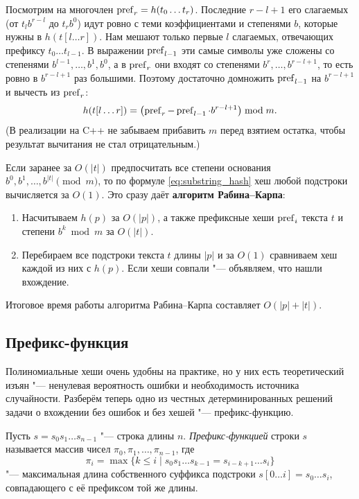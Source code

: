 Посмотрим на многочлен $\operatorname{pref}_r = h(t_0 \dots t_r)$. Последние $r - l + 1$ его слагаемых (от $t_l b^{r-l}$ до $t_r b^0$) идут ровно с теми коэффициентами и степенями $b$, которые нужны в $h(t[l \dots r])$. Нам мешают только первые $l$ слагаемых, отвечающих префиксу $t_0 \dots t_{l-1}$. В выражении $\operatorname{pref}_{l-1}$ эти самые символы уже сложены со степенями $b^{l-1}, \dots, b^1, b^0$, а в $\operatorname{pref}_r$ они входят со степенями $b^r, \dots, b^{r-l+1}$, то есть ровно в $b^{r-l+1}$ раз большими. Поэтому достаточно домножить $\operatorname{pref}_{l-1}$ на $b^{r-l+1}$ и вычесть из $\operatorname{pref}_r$:
\begin{equation}\label{eq:substring_hash}
    h(t[l \dots r]) = \bigl(\operatorname{pref}_r - \operatorname{pref}_{l-1} \cdot b^{r - l + 1}\bigr) \bmod m.
\end{equation}
(В реализации на C++ не забываем прибавить $m$ перед взятием остатка, чтобы результат вычитания не стал отрицательным.)

Если заранее за $O(|t|)$ предпосчитать все степени основания $b^0, b^1, \dots, b^{|t|} \pmod m$, то по формуле \eqref{eq:substring_hash} хеш любой подстроки вычисляется за $O(1)$. Это сразу даёт \textbf{алгоритм Рабина--Карпа}:
\begin{enumerate}
    \item Насчитываем $h(p)$ за $O(|p|)$, а также префиксные хеши $\operatorname{pref}_i$ текста $t$ и степени $b^k \bmod m$ за $O(|t|)$.
    \item Перебираем все подстроки текста $t$ длины $|p|$ и за $O(1)$ сравниваем хеш каждой из них с $h(p)$. Если хеши совпали "--- объявляем, что нашли вхождение.
\end{enumerate}
Итоговое время работы алгоритма Рабина--Карпа составляет $O(|p| + |t|)$.

\subsection{Префикс-функция}

Полиномиальные хеши очень удобны на практике, но у них есть теоретический изъян "--- ненулевая вероятность ошибки и необходимость источника случайности. Разберём теперь одно из честных детерминированных решений задачи о вхождении без ошибок и без хешей "--- префикс-функцию.

\begin{definition}
    Пусть $s = s_0 s_1 \dots s_{n-1}$ "--- строка длины $n$. \textit{Префикс-функцией} строки $s$ называется массив чисел $\pi_0, \pi_1, \dots, \pi_{n-1}$, где
    \[
        \pi_i = \max\bigl\{k \le i \;\big|\; s_0 s_1 \dots s_{k-1} = s_{i-k+1} \dots s_i\bigr\}
    \]
    "--- максимальная длина собственного суффикса подстроки $s[0 \dots i] = s_0 \dots s_i$, совпадающего с её префиксом той же длины.
\end{definition}

